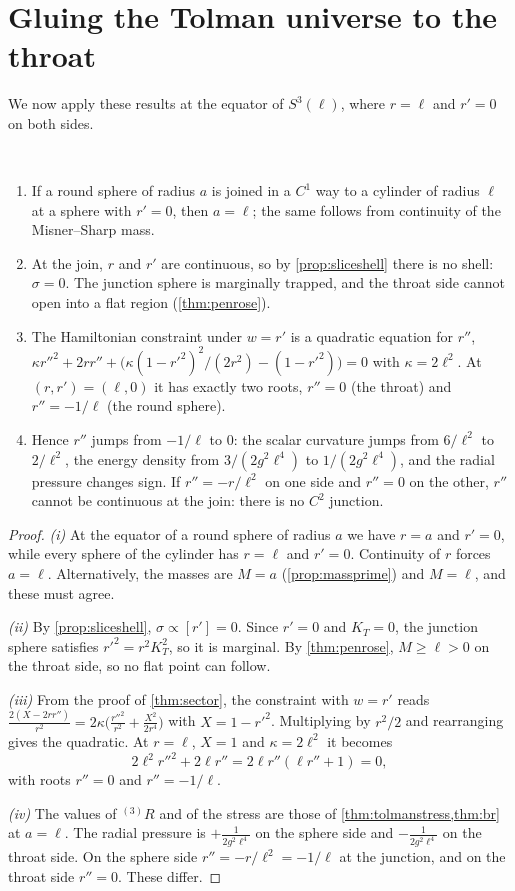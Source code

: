 \section{Gluing the Tolman universe to the throat}

We now apply these results at the equator of $S^3(\ell)$, where $r=\ell$ and $r'=0$ on both sides.

\begin{theorem}\label{thm:c1notc2}\ver\
\begin{enumerate}[label=(\roman*)]
\item If a round sphere of radius $a$ is joined in a $C^1$ way to a cylinder of radius $\ell$ at a sphere with $r'=0$, then $a=\ell$; the same follows from continuity of the Misner--Sharp mass.
\item At the join, $r$ and $r'$ are continuous, so by \cref{prop:sliceshell} there is no shell: $\sigma=0$. The junction sphere is marginally trapped, and the throat side cannot open into a flat region (\cref{thm:penrose}).
\item The Hamiltonian constraint under $w=r'$ is a quadratic equation for $r''$, $\kappa r''^2+2rr''+\bigl(\kappa(1-r'^2)^2/(2r^2)-(1-r'^2)\bigr)=0$ with $\kappa=2\ell^2$. At $(r,r')=(\ell,0)$ it has exactly two roots, $r''=0$ (the throat) and $r''=-1/\ell$ (the round sphere).
\item Hence $r''$ jumps from $-1/\ell$ to $0$: the scalar curvature jumps from $6/\ell^2$ to $2/\ell^2$, the energy density from $3/(2g^2\ell^4)$ to $1/(2g^2\ell^4)$, and the radial pressure changes sign. If $r''=-r/\ell^2$ on one side and $r''=0$ on the other, $r''$ cannot be continuous at the join: there is no $C^2$ junction.
\end{enumerate}
\end{theorem}
\begin{proof}
\emph{(i)} At the equator of a round sphere of radius $a$ we have $r=a$ and $r'=0$, while every sphere of the cylinder has $r=\ell$ and $r'=0$. Continuity of $r$ forces $a=\ell$. Alternatively, the masses are $M=a$ (\cref{prop:massprime}) and $M=\ell$, and these must agree.

\emph{(ii)} By \cref{prop:sliceshell}, $\sigma\propto[r']=0$. Since $r'=0$ and $K_T=0$, the junction sphere satisfies $r'^2=r^2K_T^2$, so it is marginal. By \cref{thm:penrose}, $M\ge\ell>0$ on the throat side, so no flat point can follow.

\emph{(iii)} From the proof of \cref{thm:sector}, the constraint with $w=r'$ reads $\frac{2(X-2rr'')}{r^2}=2\kappa\bigl(\frac{r''^2}{r^2}+\frac{X^2}{2r^4}\bigr)$ with $X=1-r'^2$. Multiplying by $r^2/2$ and rearranging gives the quadratic. At $r=\ell$, $X=1$ and $\kappa=2\ell^2$ it becomes
\[
2\ell^2r''^2+2\ell r''=2\ell r''(\ell r''+1)=0 ,
\]
with roots $r''=0$ and $r''=-1/\ell$.

\emph{(iv)} The values of ${}^{(3)}R$ and of the stress are those of \cref{thm:tolmanstress,thm:br} at $a=\ell$. The radial pressure is $+\frac1{2g^2\ell^4}$ on the sphere side and $-\frac1{2g^2\ell^4}$ on the throat side. On the sphere side $r''=-r/\ell^2=-1/\ell$ at the junction, and on the throat side $r''=0$. These differ.
\end{proof}


